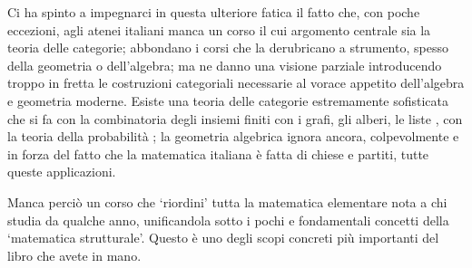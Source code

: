 Ci ha spinto a impegnarci in questa ulteriore fatica il fatto che, con poche eccezioni, agli atenei italiani manca un corso il cui argomento centrale sia la teoria delle categorie; abbondano i corsi che la derubricano a strumento, spesso della geometria o dell'algebra; ma ne danno una visione parziale introducendo troppo in fretta le costruzioni categoriali necessarie al vorace appetito dell'algebra e geometria moderne. Esiste una teoria delle categorie estremamente sofisticata che si fa con la combinatoria degli insiemi finiti \cite{a,b,c} con i grafi, gli alberi, le liste \cite{d,e,f}, con la teoria della probabilità \cite{g,h,i}; la geometria algebrica ignora ancora, colpevolmente e in forza del fatto che la matematica italiana è fatta di chiese e partiti, tutte queste applicazioni.

Manca perciò un corso che `riordini' tutta la matematica elementare nota a chi studia da qualche anno, unificandola sotto i pochi e fondamentali concetti della `matematica strutturale'. Questo è uno degli scopi concreti più importanti del libro che avete in mano.

